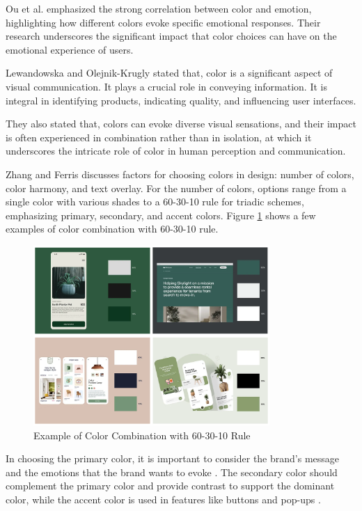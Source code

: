 Ou et al. \cite{Ou04} emphasized the strong correlation between color and emotion, highlighting how different colors evoke specific emotional responses. Their research underscores the significant impact that color choices can have on the emotional experience of users.

Lewandowska and Olejnik-Krugly \cite{Lewandowska2021} stated that, color is a significant aspect of visual communication. It plays a crucial role in conveying information. It is integral in identifying products, indicating quality, and influencing user interfaces.

They also stated that, colors can evoke diverse visual sensations, and their impact is often experienced in combination rather than in isolation, at which it underscores the intricate role of color in human perception and communication.

Zhang and Ferris \cite{Zhang16} discusses factors for choosing colors in design: number of colors, color harmony, and text overlay. For the number of colors, options range from a single color with various shades to a 60-30-10 rule for triadic schemes, emphasizing primary, secondary, and accent colors. Figure \ref{fig:color-scheme} shows a few examples of color combination with 60-30-10 rule.

\begin{figure}[!ht]
    \centering
    \includegraphics[width=0.8\textwidth]{texs/Part2/chapter3/image/colorexample.png}
    \caption{Example of Color Combination with 60-30-10 Rule \cite{M._2023}}
    \label{fig:color-scheme}
\end{figure}

In choosing the primary color, it is important to consider the brand's message and the emotions that the brand wants to evoke \cite{M._2023}. The secondary color should complement the primary color and provide contrast to support the dominant color, while the accent color is used in features like buttons and pop-ups  \cite{M._2023}.

